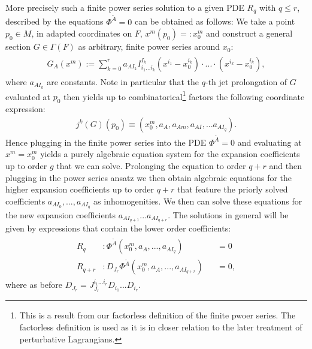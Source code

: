 \documentclass[a4paper,12pt, DIV=14, BCOR=5mm, twoside, headsepline, numbers=noenddot]{scrbook}
\begin{document}
More precisely such a finite power series solution to a given PDE $R_q$ with $q\leq r$, described by the equations $\Phi^{\tilde{A}} = 0$ can be obtained as follows: We take a point $p_0 \in M$, in adapted coordinates on $F$, $x^m(p_0) =: x_0^m$ and construct a general section $G\in\Gamma(F)$ as arbitrary, finite power series around $x_0$:
\begin{align}
\begin{aligned}
    G_A(x^m) :=  \sum_{k=0}^{r} a_{AI_k}I^{I_k}_{i_1...i_k}(x^{i_1}-x_0^{i_k}) \cdot ... \cdot (x^{i_k}- x_0^{i_k}), 
\end{aligned}
\end{align}
where $a_{AI_k}$ are constants. Note in particular that the $q$-th jet prolongation of $G$ evaluated at $p_0$ then yields up to combinatorical\footnote{This is a result from our factorless definition of the finite pwoer series. The factorless definition is used as it is in closer relation to the later treatment of perturbative Lagrangians.} factors the following coordinate expression:
\begin{align}
    j^k(G)(p_0) \equiv \left ( x_0^m, a_A, a_{Am}, a_{AI}, ... a_{AI_q} \right ).
\end{align}
Hence plugging in the finite power series into the PDE $\Phi^{\tilde{A}} =0$ and evaluating at $x^m=x^m_0$ yields a purely algebraic equation system for the expansion coefficients up to order $g$ that we can solve. Prolonging the equation to order $q+r$ and then plugging in the power series ansatz we then obtain algebraic equations for the higher expansion coefficients up to order $q+r$ that feature the priorly solved coefficients $a_{AI_0},...,a_{AI_q}$ as inhomogenities. We then can solve these equations for the new expansion coefficients $a_{AI_{q+1}}...a_{AI_{q+r}}$. The solutions in general will be given by expressions that contain the lower order coefficients:
\begin{align}
\begin{aligned}
R_q &: \Phi^{\tilde{A}}(x_0^m,a_A,...,a_{AI_q}) &&= 0 \\
R_{q+r} &:  D_{J_r}\Phi^{\tilde{A}}(x_0^m,a_A,...,a_{AI_{q+r}}) &&= 0,
\end{aligned}
\end{align}
where as before $D_{J_r} = J^{i_1...i_r}_{J_r} D_{i_1} ... D_{i_r}$.
\end{document}
